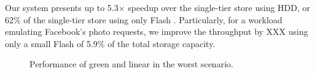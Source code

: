 Our system presents up to 5.3$\times$ speedup over the single-tier
store using HDD, or 62\% of the single-tier store using only Flash .
Particularly, for a workload emulating Facebook's photo requests, we
improve the throughput by XXX using only a small Flash of 5.9\% of the
total storage capacity.

\begin{figure}[t]
\begin{centering}
\caption{Performance of green and linear in the worst scenario. }
\label{fig:worst}
\end{centering}
\end{figure}





